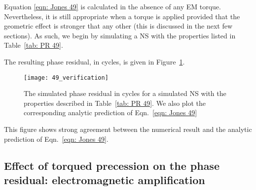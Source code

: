 \documentclass[../full_thesis/full_thesis.tex]{subfiles}
\begin{document}
Equation \eqref{eqn: Jones 49} is calculated in the absence of any EM torque.
Nevertheless, it is still appropriate when a torque is applied provided
that the geometric effect is stronger that any other (this is discussed in
the next few sections). As such, we begin by simulating a NS with the properties
listed in Table~\ref{tab: PR 49}.
\begin{table}[htb]
\centering

\caption{Simulation parameters used for the phase residual plotted in Figure~\ref{fig: PR 49}}
\label{tab: PR 49}
\end{table}
The resulting phase residual, in cycles, is
given in Figure~\ref{fig: PR 49}.
\begin{figure}[htb]
\centering
\texttt{[image: 49\_verification]}
\caption{The simulated phase residual in cycles for a simulated NS with the
properties described in Table~\ref{tab: PR 49}. We also plot the corresponding
analytic prediction of Eqn.~\eqref{eqn: Jones 49}}
\label{fig: PR 49}
\end{figure}
This figure shows strong agreement between the numerical result and the
analytic prediction of Eqn.~\eqref{eqn: Jones 49}. 

\subsection{Effect of torqued precession on the phase residual: electromagnetic amplification}
\label{sec: phase residual torqued}
\end{document}
